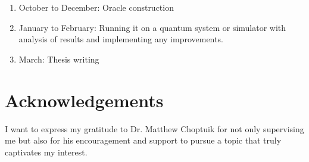 \documentclass[twocolumn,showpacs,preprintnumbers,amsmath,amssymb]{revtex4}
\begin{document}
		
		\begin{enumerate}
			\item October to December:  Oracle construction
			\item January to February:  Running it on a quantum system or simulator with analysis of results and implementing any improvements.
			\item  March: Thesis writing
		\end{enumerate}
		
		
		
		\section{Acknowledgements}
		
		I want to express my gratitude to Dr. Matthew Choptuik for not only supervising me but also 
		for his encouragement and support to pursue a topic that truly captivates my interest.
		
		\begin{thebibliography}{99}
			
		\end{thebibliography}
		
		
	
\end{document}
